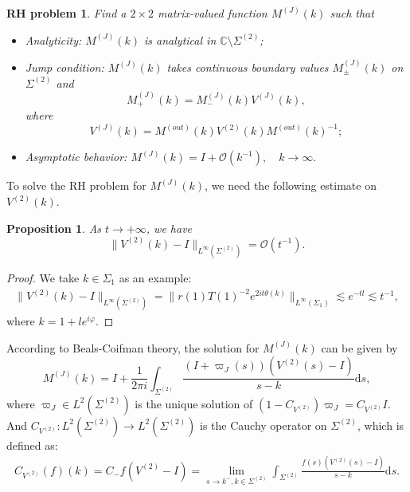 \documentclass[11pt]{article}
\numberwithin{equation}{section}
\newtheorem{Proposition}{Proposition}
\newtheorem{RHP}{RH problem}
\begin{document}
\begin{RHP}
    Find a $2 \times 2$ matrix-valued function $M^{(J)}(k)$ such that  \begin{itemize}
        \item Analyticity: $M^{(J)}(k)$ is analytical in $\mathbb{C} \setminus \Sigma^{(2)}$;
\item Jump condition: $M^{(J)}(k)$ takes continuous boundary values $M^{(J)}_\pm(k)$ on $\Sigma^{(2)}$ and
\begin{equation*}
M^{(J)}_+(k) = M^{(J)}_-(k) V^{(J)}(k),
\end{equation*}
where
\begin{equation*}
V^{(J)}(k) =
M^{(out)}(k)V^{(2)}(k)M^{(out)}(k)^{-1};
\end{equation*}
\item Asymptotic behavior: $M^{(J)}(k) = I + \mathcal{O}(k^{-1}), \quad k \to \infty .$
  \end{itemize}
\end{RHP}
To solve the RH problem for $M^{(J)}(k)$, we need the following estimate on $V^{(2)}(k)$.
\begin{Proposition}\label{p32}
    As $t\to+\infty$, we have
    \begin{equation*}
        \|V^{(2)}(k)-I\|_{L^\infty\left(\Sigma^{(2)}\right)}=\mathcal{O}(t^{-1}).
    \end{equation*}
\end{Proposition}
\begin{proof}
    We take $k\in\Sigma_1$ as an example:
    \begin{align*}
         \|V^{(2)}(k)-I\|_{L^\infty\left(\Sigma^{(2)}\right)}=\|r(1)T(1)^{-2}e^{2it\theta(k)}\|_{L^\infty\left(\Sigma_1\right)}\lesssim e^{-tl}\lesssim t^{-1},
    \end{align*}
    where $k=1+le^{i\varphi}$.
\end{proof}

According to Beals-Coifman theory, the solution for $M^{(J)}(k)$ can be given by
\begin{equation*}
M^{(J)}(k) = I + \frac{1}{2\pi i} \int_{\Sigma^{(2)}} \frac{(I + \varpi_J(s))(V^{(2)}(s) - I)}{s - k} \mathrm{d}s,
\end{equation*}
where $\varpi_J \in L^2(\Sigma^{(2)})$ is the unique solution of $(1 - C_{V^{(2)}})\varpi_J = C_{V^{(2)}} I$. And $C_{V^{(2)}}: L^2(\Sigma^{(2)}) \to L^2(\Sigma^{(2)})$ is the Cauchy operator on $\Sigma^{(2)}$, which is defined as:
\begin{align*}
C_{V^{(2)}}(f)(k) = C_{-}f(V^{(2)} - I) = \lim_{s \to k^-, k \in \Sigma^{(2)}} \int_{\Sigma^{(2)}} \frac{f(s)(V^{(2)}(s) - I)}{s - k} \mathrm{d}s.
\end{align*}
\end{document}
